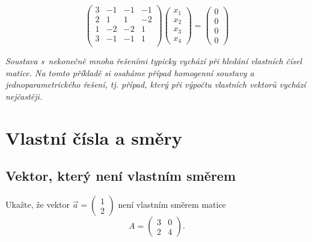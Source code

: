 \begin{equation*}
  \begin{pmatrix}
3 &-1 &-1 &-1\\ 
2 &1 &1 &-2 \\
1 &-2 &-2 &1 \\
3 &-1 &-1 &1 \\
\end{pmatrix}
\begin{pmatrix}
  x_1 \\ x_2 \\x_3\\x_4
\end{pmatrix}
=
\begin{pmatrix}
  0 \\ 0 \\0\\0
\end{pmatrix}
\end{equation*}

\textit{Soustava s nekonečně mnoha řešeními typicky vychází při
  hledání vlastních čísel matice. Na tomto příkladě si osaháme případ
  homogenní soustavy a jednoparametrického řešení, tj. případ, který
  při výpočtu vlastních vektorů vychází nejčastěji.}







\stranka
\section{Vlastní čísla a směry}

\subsection{Vektor, který není vlastním směrem}

Ukažte, že vektor $\vec a=
  \begin{pmatrix}
    1\\2
  \end{pmatrix}
  $
není vlastním směrem matice $$A=\begin{pmatrix}  3& 0 \\ 2 &4\end{pmatrix}.$$

